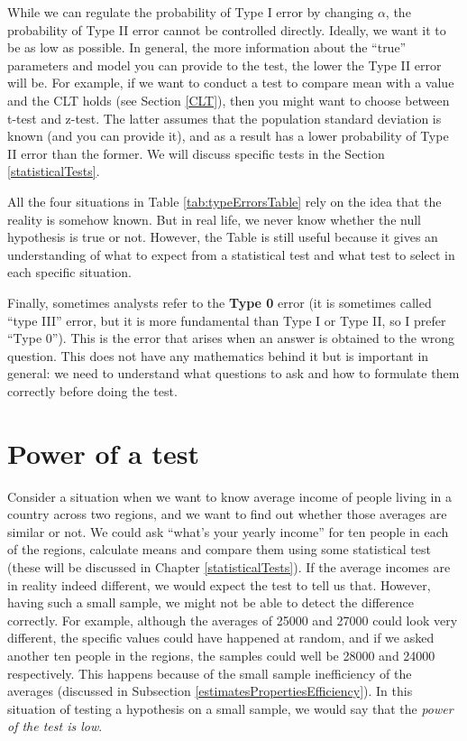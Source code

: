 \documentclass[
]{book}
\theoremstyle{definition}
\theoremstyle{definition}
\theoremstyle{definition}
\theoremstyle{definition}
\theoremstyle{remark}
\begin{document}
While we can regulate the probability of Type I error by changing \(\alpha\), the probability of Type II error cannot be controlled directly. Ideally, we want it to be as low as possible. In general, the more information about the ``true'' parameters and model you can provide to the test, the lower the Type II error will be. For example, if we want to conduct a test to compare mean with a value and the CLT holds (see Section \ref{CLT}), then you might want to choose between t-test and z-test. The latter assumes that the population standard deviation is known (and you can provide it), and as a result has a lower probability of Type II error than the former. We will discuss specific tests in the Section \ref{statisticalTests}.

All the four situations in Table \ref{tab:typeErrorsTable} rely on the idea that the reality is somehow known. But in real life, we never know whether the null hypothesis is true or not. However, the Table is still useful because it gives an understanding of what to expect from a statistical test and what test to select in each specific situation.

Finally, sometimes analysts refer to the \textbf{Type 0} error (it is sometimes called ``type III'' error, but it is more fundamental than Type I or Type II, so I prefer ``Type 0''). This is the error that arises when an answer is obtained to the wrong question. This does not have any mathematics behind it but is important in general: we need to understand what questions to ask and how to formulate them correctly before doing the test.

\section{Power of a test}\label{powerOfTheTest}

Consider a situation when we want to know average income of people living in a country across two regions, and we want to find out whether those averages are similar or not. We could ask ``what's your yearly income'' for ten people in each of the regions, calculate means and compare them using some statistical test (these will be discussed in Chapter \ref{statisticalTests}). If the average incomes are in reality indeed different, we would expect the test to tell us that. However, having such a small sample, we might not be able to detect the difference correctly. For example, although the averages of 25000 and 27000 could look very different, the specific values could have happened at random, and if we asked another ten people in the regions, the samples could well be 28000 and 24000 respectively. This happens because of the small sample inefficiency of the averages (discussed in Subsection \ref{estimatesPropertiesEfficiency}). In this situation of testing a hypothesis on a small sample, we would say that the \emph{power of the test is low}.
\end{document}
